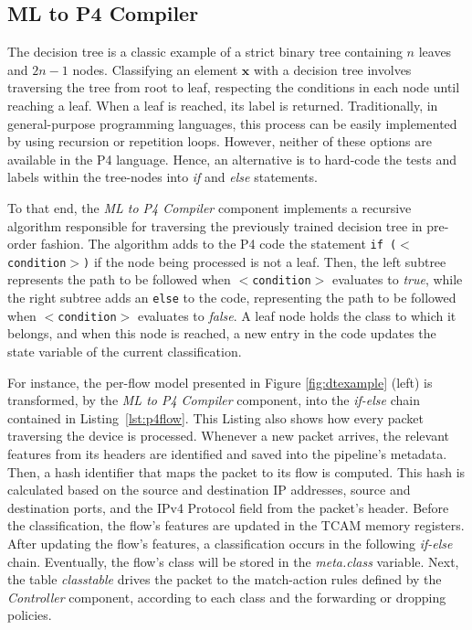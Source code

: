 \subsection{ML to P4 Compiler}\label{sub:compiler}

The decision tree is a classic example of a strict binary tree containing $n$ leaves and $2n-1$ nodes. 
Classifying an element $\mathbf{x}$ with a decision tree involves traversing the tree from root to leaf, respecting the conditions in each node until reaching a leaf. When a leaf is reached, its label is returned.
Traditionally, in general-purpose programming languages, this process can be easily implemented by using recursion or repetition loops. However, neither of these options are available in the P4 language. Hence, an alternative is to hard-code the tests and labels within the tree-nodes into \emph{if} and \emph{else} statements.

To that end, the \emph{ML to P4 Compiler} component implements a recursive algorithm responsible for traversing the previously trained decision tree in pre-order fashion. The algorithm adds to the P4 code the statement \texttt{if ($<$condition$>$)} if the node being processed is not a leaf. Then, the left subtree represents the path to be followed when \texttt{$<$condition$>$} evaluates to \emph{true}, while the right subtree adds an \texttt{else} to the code, representing the path to be followed when \texttt{$<$condition$>$} evaluates to \emph{false}. 
A leaf node holds the class to which it belongs, and when this node is reached, a new entry in the code updates the state variable of the current classification.

For instance, the per-flow model presented in Figure \ref{fig:dtexample} (left) is transformed, by the \emph{ML to P4 Compiler} component, into the \emph{if-else} chain contained in Listing~\ref{lst:p4flow}. This Listing also shows how every packet traversing the device is processed. Whenever a new packet arrives, the relevant features from its headers are identified and saved into the pipeline's metadata. 
Then, a hash identifier that maps the packet to its flow is computed. This hash is calculated based on the source and destination IP addresses, source and destination ports, and the IPv4 Protocol field from the packet's header. Before the classification, the flow's features are updated in the TCAM memory registers.
After updating the flow's features, a classification occurs in the following \emph{if-else} chain. Eventually, the flow's class will be stored in the \emph{meta.class} variable.
Next, the table \emph{classtable} drives the packet to the match-action rules defined by the \emph{Controller} component, according to each class and the forwarding or dropping policies.

